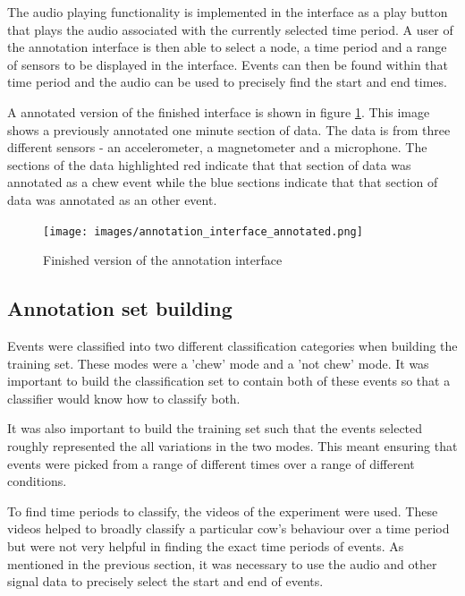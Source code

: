 The audio playing functionality is implemented in the interface as a play button that plays the audio associated with the currently selected time period. A user of the annotation interface is then able to select a node, a time period and a range of sensors to be displayed in the interface. Events can then be found within that time period and the audio can be used to precisely find the start and end times. 

A annotated version of the finished interface is shown in figure \ref{annotationinterface}. This image shows a previously annotated one minute section of data. The data is from three different sensors - an accelerometer, a magnetometer and a microphone. The sections of the data highlighted red indicate that that section of data was annotated as a chew event while the blue sections indicate that that section of data was annotated as an other event. 

\begin{figure}[ht!]
\begin{center}
\leavevmode
\texttt{[image: images/annotation\_interface\_annotated.png]}
\end{center}
\caption{Finished version of the annotation interface}
\label{annotationinterface}
\end{figure}

\subsection{Annotation set building}

Events were classified into two different classification categories when building the training set. These modes were a 'chew' mode and a 'not chew' mode. It was important to build the classification set to contain both of these events so that a classifier would know how to classify both. 

It was also important to build the training set such that the events selected roughly represented the all variations in the two modes. This meant ensuring that events were picked from a range of different times over a range of different conditions.

To find time periods to classify, the videos of the experiment were used. These videos helped to broadly classify a particular cow's behaviour over a time period but were not very helpful in finding the exact time periods of events. As mentioned in the previous section, it was necessary to use the audio and other signal data to precisely select the start and end of events. 

